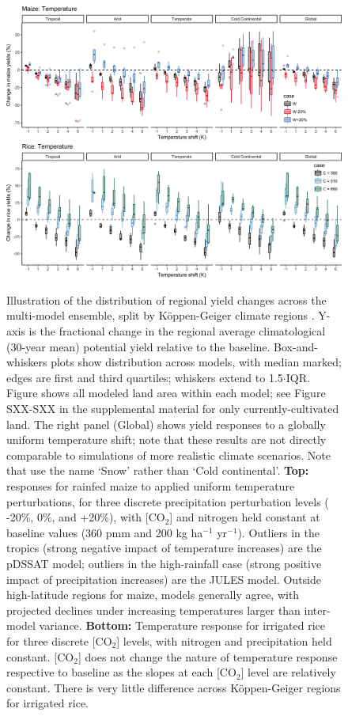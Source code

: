 \documentclass[gmd, manuscript]{copernicus} %
\begin{document}
\begin{figure}[ht]
\centering
   \includegraphics[width=15cm]{figures/maize_sim_CG_T.png}
   \includegraphics[width=15cm]{figures/rice_sim_CG_T.png}
   \caption{Illustration of the distribution of regional yield changes across the multi-model ensemble, split by K\"{o}ppen-Geiger climate regions \citep{rubel2010}.
	Y-axis is the fractional change in the regional average climatological (30-year mean) potential yield relative to the baseline. Box-and-whiskers plots show distribution across models, with median marked; edges are first and third quartiles; whiskers extend to 1.5$\cdot$IQR.
	Figure shows all modeled land area within each model; see Figure SXX-SXX in the supplemental material for only currently-cultivated land.
	The right panel (Global) shows yield responses to a globally uniform temperature shift; note that these results are not directly comparable to simulations of more realistic climate scenarios.
	Note that \citet{rubel2010} use the name `Snow' rather than `Cold continental'. 
	\textbf{Top:} responses for rainfed maize to applied uniform temperature perturbations, for three discrete precipitation perturbation levels ( -20\%, 0\%, and +20\%), with [CO$_2$] and nitrogen held constant at baseline values (360 pmm and 200 kg ha$^{-1}$ yr$^{-1}$). 
	Outliers in the tropics (strong negative impact of temperature increases) are the pDSSAT model; outliers in the high-rainfall case (strong positive impact of precipitation increases) are the JULES model. 
	Outside high-latitude regions for maize, models generally agree, with projected declines under increasing temperatures larger than inter-model variance. 
	\textbf{Bottom:} Temperature response for irrigated rice for three discrete [CO$_2$] levels, with nitrogen and precipitation held constant. [CO$_2$] does not change the nature of temperature response respective to baseline as the slopes at each [CO$_2$] level are relatively constant.
	There is very little difference across K\"{o}ppen-Geiger regions for irrigated rice.}
   \label{fig:maizerice}
\end{figure}
\end{document}
